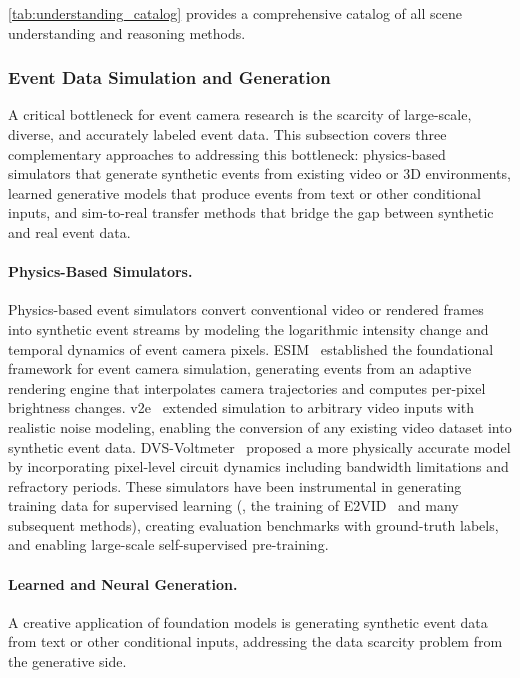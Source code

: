 \cref{tab:understanding_catalog} provides a comprehensive catalog of all scene understanding and reasoning methods.


\subsubsection{Event Data Simulation and Generation}
\label{sec:understanding_gen}

A critical bottleneck for event camera research is the scarcity of large-scale, diverse, and accurately labeled event data. This subsection covers three complementary approaches to addressing this bottleneck: physics-based simulators that generate synthetic events from existing video or 3D environments, learned generative models that produce events from text or other conditional inputs, and sim-to-real transfer methods that bridge the gap between synthetic and real event data.

\paragraph{Physics-Based Simulators.}
Physics-based event simulators convert conventional video or rendered frames into synthetic event streams by modeling the logarithmic intensity change and temporal dynamics of event camera pixels. ESIM~\cite{rebecq2018esim} established the foundational framework for event camera simulation, generating events from an adaptive rendering engine that interpolates camera trajectories and computes per-pixel brightness changes. v2e~\cite{hu2021v2e} extended simulation to arbitrary video inputs with realistic noise modeling, enabling the conversion of any existing video dataset into synthetic event data. DVS-Voltmeter~\cite{lin2022dvsvoltmeter} proposed a more physically accurate model by incorporating pixel-level circuit dynamics including bandwidth limitations and refractory periods. These simulators have been instrumental in generating training data for supervised learning (\eg, the training of E2VID~\cite{rebecq2019e2vid} and many subsequent methods), creating evaluation benchmarks with ground-truth labels, and enabling large-scale self-supervised pre-training.

\paragraph{Learned and Neural Generation.}
A creative application of foundation models is generating synthetic event data from text or other conditional inputs, addressing the data scarcity problem from the generative side.

